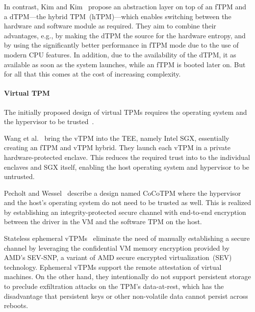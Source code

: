 In contrast, Kim and Kim~\cite{Kim2019} propose an abstraction layer on top of an \ac{fTPM} and a \ac{dTPM}---the hybrid TPM~(hTPM)---which enables switching between the hardware and software module as required.
They aim to combine their advantages, e.g., by making the dTPM the source for the hardware entropy, and by using the significantly better performance in \ac{fTPM} mode due to the use of modern CPU features.
In addition, due to the availability of the \ac{dTPM}, it as available as soon as the system launches, while an \ac{fTPM} is booted later on.
But for all that this comes at the cost of increasing complexity.

\paragraph{Virtual TPM}

The initially proposed design of virtual \acp{TPM} requires the operating system and the hypervisor to be trusted~\cite{268868}.

Wang et al.~\cite{Wang2019} bring the vTPM into the \ac{TEE}, namely Intel SGX, essentially creating an fTPM and vTPM hybrid.
They launch each vTPM in a private hardware-protected enclave.
This reduces the required trust into to the individual enclaves and SGX itself, enabling the host operating system and hypervisor to be untrusted.

Pecholt and Wessel~\cite{Pecholt2022} describe a design named CoCoTPM where the hypervisor and the host's operating system do not need to be trusted as well.
This is realized by establishing an integrity-protected secure channel with end-to-end encryption between the driver in the VM and the software TPM on the host.

Stateless ephemeral vTPMs~\cite{Narayanan2023} eliminate the need of manually establishing a secure channel by leveraging the confidential VM memory encryption provided by AMD's SEV-SNP, a variant of AMD secure encrypted virtualization~(SEV) technology.
Ephemeral vTPMs support the remote attestation of virtual machines.
On the other hand, they intentionally do not support persistent storage to preclude exfiltration attacks on the TPM's data-at-rest, which has the disadvantage that persistent keys or other non-volatile data cannot persist across reboots.


